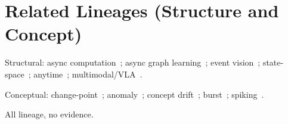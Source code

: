 \section{Related Lineages (Structure and Concept)}
\label{sec:related-lineages}

Structural: async
computation~\citep{bertsekas1989parallel,niu2011hogwild}; async graph
learning~\citep{faber2022async,faber2024gwac}; event
vision~\citep{gallego2022eventvision,schaefer2022aegnn};
state-space~\citep{gu2022s4,gu2023mamba};
anytime~\citep{teerapittayanon2016branchynet,huang2018msdnet};
multimodal/VLA~\citep{dosovitskiy2021vit,radford2021clip,li2023blip2,zhang2023mcot,brohan2023rt2,kim2024openvla,octo2024,khazatsky2024droid}.

Conceptual:
change-point~\citep{adams2007changepoint,aminikhanghahi2017changepoint};
anomaly~\citep{blazquez2021tsoutlier,ma2021graphanomaly}; concept
drift~\citep{gama2014conceptdrift,lu2019conceptdrift};
burst~\citep{legenstein2011branching,shew2013criticality};
spiking~\citep{maass1997spiking,tavanaei2019snnsurvey}.

All lineage, no evidence.

